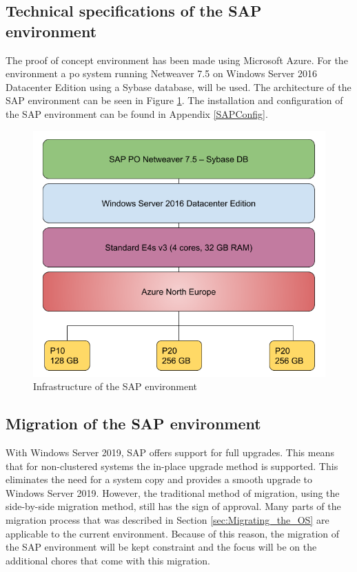 \subsection{Technical specifications of the SAP environment}
The proof of concept environment has been made using Microsoft Azure. 
For the environment a \acrfull{po} system running Netweaver 7.5 on Windows Server 2016 Datacenter Edition using a Sybase database, will be used. 
The architecture of the SAP environment can be seen in Figure \ref{fig:SAPInfra}.
The installation and configuration of the SAP environment can be found in Appendix \ref{SAPConfig}.

\begin{figure}[h]
	\captionsetup{width=0.8\linewidth}
	\includegraphics[width=0.9\linewidth]{img/Methodologie/SAP_PO.png}
	\centering
	\caption[SAP Infrastructure]{Infrastructure of the SAP environment}
	\label{fig:SAPInfra}	
\end{figure}

\subsection{Migration of the SAP environment}
With Windows Server 2019, SAP offers support for full upgrades. 
This means that for non-clustered systems the in-place upgrade method is supported.
This eliminates the need for a system copy and provides a smooth upgrade to Windows Server 2019. 
However, the traditional method of migration, using the side-by-side migration method, still has the sign of approval. 
Many parts of the migration process that was described in Section \ref{sec:Migrating_the_OS} are applicable to the current environment. 
Because of this reason, the migration of the SAP environment will be kept constraint and the focus will be on the additional chores that come with this migration.

